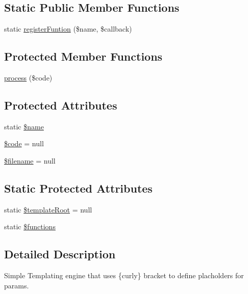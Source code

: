 \subsection*{Static Public Member Functions}
\begin{DoxyCompactItemize}
\item 
static \hyperlink{classWEPPO_1_1Presentation_1_1CurlyTemplate_a551583ff866e12031c1389862680a530}{register\+Funtion} (\$name, \$callback)
\end{DoxyCompactItemize}
\subsection*{Protected Member Functions}
\begin{DoxyCompactItemize}
\item 
\hyperlink{classWEPPO_1_1Presentation_1_1CurlyTemplate_a2674a92a6cb98fb4ee0668c51aa1aeb3}{process} (\$code)
\end{DoxyCompactItemize}
\subsection*{Protected Attributes}
\begin{DoxyCompactItemize}
\item 
static \hyperlink{classWEPPO_1_1Presentation_1_1CurlyTemplate_a293c875cfe777123a111d451fbe7bec2}{\$name}
\item 
\hyperlink{classWEPPO_1_1Presentation_1_1CurlyTemplate_a67b9713b3f6784e6639c356ad3ffca9b}{\$code} = null
\item 
\hyperlink{classWEPPO_1_1Presentation_1_1CurlyTemplate_ab878bd221d9d33c4052cd8fad690e11c}{\$filename} = null
\end{DoxyCompactItemize}
\subsection*{Static Protected Attributes}
\begin{DoxyCompactItemize}
\item 
static \hyperlink{classWEPPO_1_1Presentation_1_1CurlyTemplate_aebc84667fdecb071bd5efdd06f4524fc}{\$template\+Root} = null
\item 
static \hyperlink{classWEPPO_1_1Presentation_1_1CurlyTemplate_a443c112631fb71bf1a129c54932da46f}{\$functions}
\end{DoxyCompactItemize}


\subsection{Detailed Description}
Simple Templating engine that uses \{curly\} bracket to define placholders for params.

